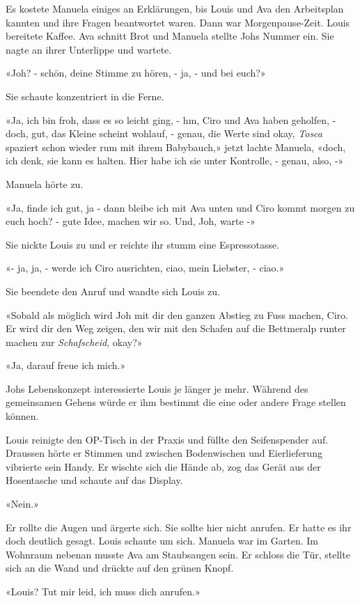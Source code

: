 Es kostete Manuela einiges an Erklärungen, bis Louis und Ava den Arbeitsplan kannten und ihre Fragen
beantwortet waren.
Dann war Morgenpause-Zeit. Louis bereitete Kaffee. Ava schnitt Brot und
Manuela stellte Johs Nummer ein. Sie nagte an ihrer Unterlippe und
wartete.

«Joh? - schön, deine Stimme zu hören, - ja, - und bei euch?»

Sie schaute konzentriert in die Ferne.

«Ja, ich bin froh, dass es so leicht ging, - hm, Ciro und Ava haben
geholfen, - doch, gut, das Kleine scheint wohlauf, - genau, die Werte sind
okay, \emph{Tosca} spaziert schon wieder rum mit ihrem Babybauch,» jetzt
lachte Manuela, «doch, ich denk, sie kann es halten. Hier habe ich sie
unter Kontrolle, - genau, also, -»

Manuela hörte zu.

«Ja, finde ich gut, ja - dann bleibe ich mit Ava unten und Ciro kommt
morgen zu euch hoch? - gute Idee, machen wir so. Und, Joh, warte -»

Sie nickte Louis zu und er reichte ihr stumm eine Espressotasse.

«- ja, ja, - werde ich Ciro ausrichten, ciao, mein Liebster, - ciao.»

Sie beendete den Anruf und wandte sich Louis zu.

«Sobald als möglich wird Joh mit dir den ganzen Abstieg zu Fuss machen, Ciro.
Er wird dir den Weg zeigen, den wir mit den Schafen auf die Bettmeralp
runter machen zur \emph{Schafscheid}, okay?»

«Ja, darauf freue ich mich.»

Johs Lebenskonzept interessierte Louis je länger je mehr. Während des gemeinsamen Gehens würde er ihm bestimmt die eine oder andere Frage stellen können.

Louis reinigte den OP-Tisch in der Praxis und füllte den Seifenspender
auf. Draussen hörte er Stimmen und zwischen Bodenwischen und
Eierlieferung vibrierte sein Handy. Er wischte sich die Hände ab, 
zog das Gerät aus der Hosentasche und schaute auf das Display. 

«Nein.»

Er rollte die Augen und ärgerte sich. Sie sollte hier nicht anrufen.
Er hatte es ihr doch deutlich gesagt. Louis schaute um sich. Manuela war im Garten. Im Wohnraum nebenan musste Ava am Staubsaugen sein. Er schloss die Tür, stellte sich an die Wand und
drückte auf den grünen Knopf.

«Louis? Tut mir leid, ich muss dich anrufen.»

